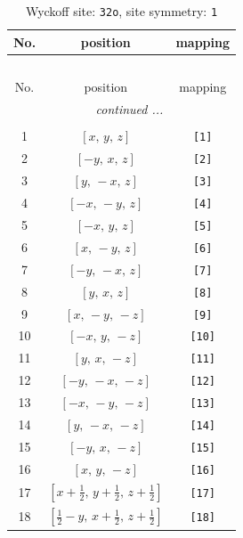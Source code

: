 \documentclass[fleqn,8pt]{jsarticle}
\begin{document}
\renewcommand{\arraystretch}{1.2}
\begin{longtable}{ccc}
\caption{Wyckoff site: {\tt 32o}, site symmetry: {\tt 1}}
 \\
 \hline \hline
No. & position & mapping \\ \hline \endfirsthead

\multicolumn{2}{l}{\tablename\ \thetable{}} \\
 \hline \hline
No. & position & mapping \\ \hline \endhead

 \hline \hline
\multicolumn{2}{r}{\footnotesize\it continued ...} \\ \endfoot

 \hline \hline
\multicolumn{2}{r}{} \\ \endlastfoot

1 & $\left[ x,\, y,\, z \right]$ & {\tt [1]} \\ \hline
2 & $\left[ - y,\, x,\, z \right]$ & {\tt [2]} \\ \hline
3 & $\left[ y,\, - x,\, z \right]$ & {\tt [3]} \\ \hline
4 & $\left[ - x,\, - y,\, z \right]$ & {\tt [4]} \\ \hline
5 & $\left[ - x,\, y,\, z \right]$ & {\tt [5]} \\ \hline
6 & $\left[ x,\, - y,\, z \right]$ & {\tt [6]} \\ \hline
7 & $\left[ - y,\, - x,\, z \right]$ & {\tt [7]} \\ \hline
8 & $\left[ y,\, x,\, z \right]$ & {\tt [8]} \\ \hline
9 & $\left[ x,\, - y,\, - z \right]$ & {\tt [9]} \\ \hline
10 & $\left[ - x,\, y,\, - z \right]$ & {\tt [10]} \\ \hline
11 & $\left[ y,\, x,\, - z \right]$ & {\tt [11]} \\ \hline
12 & $\left[ - y,\, - x,\, - z \right]$ & {\tt [12]} \\ \hline
13 & $\left[ - x,\, - y,\, - z \right]$ & {\tt [13]} \\ \hline
14 & $\left[ y,\, - x,\, - z \right]$ & {\tt [14]} \\ \hline
15 & $\left[ - y,\, x,\, - z \right]$ & {\tt [15]} \\ \hline
16 & $\left[ x,\, y,\, - z \right]$ & {\tt [16]} \\ \hline
17 & $\left[ x + \frac{1}{2},\, y + \frac{1}{2},\, z + \frac{1}{2} \right]$ & {\tt [17]} \\ \hline
18 & $\left[ \frac{1}{2} - y,\, x + \frac{1}{2},\, z + \frac{1}{2} \right]$ & {\tt [18]} \\ \hline

\end{longtable}
\end{document}
